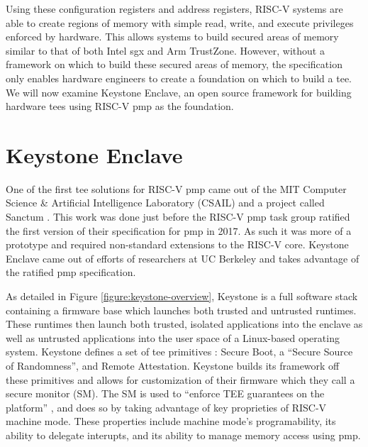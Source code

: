 Using these configuration registers and address registers, RISC-V systems are able to create regions of memory with simple read, write, and execute privileges enforced by hardware. This allows systems to build secured areas of memory similar to that of both Intel \gls{sgx} and Arm TrustZone. However, without a framework on which to build these secured areas of memory, the specification only enables hardware engineers to create a foundation on which to build a \gls{tee}. We will now examine Keystone Enclave, an open source framework for building hardware \glspl{tee} using RISC-V \gls{pmp} as the foundation.

\section{Keystone Enclave}
One of the first \gls{tee} solutions for RISC-V \gls{pmp} came out of the MIT Computer Science \& Artificial Intelligence Laboratory (CSAIL) and a project called Sanctum \cite{Costan2016a}. This work was done just before the RISC-V \gls{pmp} task group ratified the first version of their specification for \gls{pmp} in 2017. As such it was more of a prototype and required non-standard extensions to the RISC-V core. Keystone Enclave came out of efforts of researchers at UC Berkeley and takes advantage of the ratified \gls{pmp} specification.

As detailed in Figure \ref{figure:keystone-overview}, Keystone is a full software stack containing a firmware base which launches both trusted and untrusted runtimes. These runtimes then launch both trusted, isolated applications into the enclave as well as untrusted applications into the user space of a Linux-based operating system. Keystone defines a set of \gls{tee} primitives \cite{lee2020keystone}: Secure Boot, a ``Secure Source of Randomness'', and Remote Attestation. Keystone builds its framework off these primitives and allows for customization of their firmware which they call a secure monitor (SM). The SM is used to ``enforce TEE guarantees on the platform'' \cite{lee2019keystone}, and does so by taking advantage of key proprieties of RISC-V machine mode. These properties include machine mode's programability, its ability to delegate interupts, and its ability to manage memory access using \gls{pmp}.

